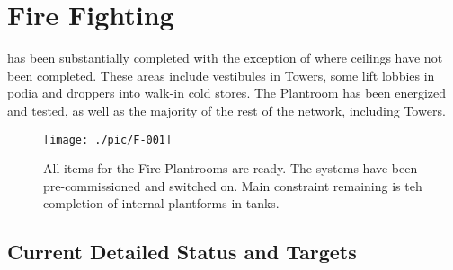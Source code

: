 
\chapter{Fire Fighting}


 has been substantially
completed with the exception of where ceilings have not been completed. These areas include vestibules in Towers, some lift lobbies in podia and droppers into walk-in cold stores. The
Plantroom has been energized and tested, as well as the majority of the rest of the network, including Towers.

\begin{figure*}
\texttt{[image: ./pic/F-001]}
\caption{All items for the Fire Plantrooms are ready. The systems have been pre-commissioned and
switched on. Main constraint remaining is teh completion of internal plantforms in tanks.}
\end{figure*}
 

\section{Current Detailed Status and Targets}


